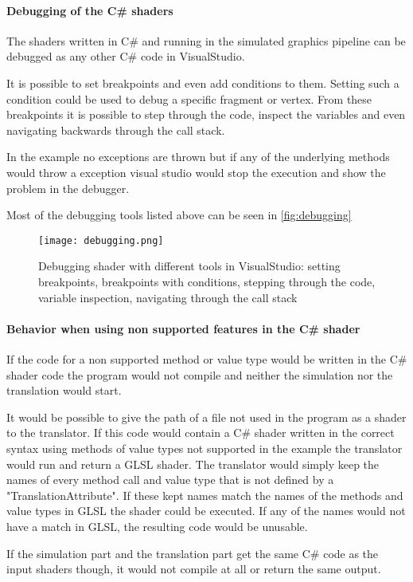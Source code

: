 \paragraph{Debugging of the C\# shaders}

The shaders written in C\# and running in the simulated graphics pipeline can be debugged as any other C\# code in VisualStudio.

It is possible to set breakpoints and even add conditions to them. Setting such a condition could be used to debug a specific fragment or vertex. From these breakpoints it is possible to step through the code, inspect the variables and even navigating backwards through the call stack.

In the example no exceptions are thrown but if any of the underlying methods would throw a exception visual studio would stop the execution and show the problem in the debugger.

Most of the debugging tools listed above can be seen in \autoref{fig:debugging}

\begin{figure}[h!]
  \centering 
  \texttt{[image: debugging.png]}
  \caption[Screenshot of debug screen within VisualStudio]{Debugging shader with different tools in VisualStudio: setting breakpoints, breakpoints with conditions, stepping through the code, variable inspection, navigating through the call stack}
  \label{fig:debugging}
\end{figure}

\paragraph{Behavior when using non supported features in the C\# shader}

If the code for a non supported method or value type would be written in the C\# shader code the program would not compile and neither the simulation nor the translation would start.

It would be possible to give the path of a file not used in the program as a shader to the translator. If this code would contain a C\# shader written in the correct syntax using methods of value types not supported in the example the translator would run and return a GLSL shader. The translator would simply keep the names of every method call and value type that is not defined by a "TranslationAttribute". If these kept names match the names of the methods and value types in GLSL the shader could be executed. If any of the names would not have a match in GLSL, the resulting code would be unusable.

If the simulation part and the translation part get the same C\# code as the input shaders though, it would not compile at all or return the same output.